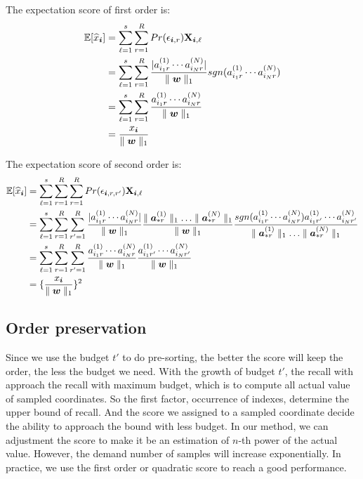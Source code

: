 \documentclass{article}
\newcommand{\Sca}[3]{{#1}^{(#2)}_{i_#2#3}}%
\newcommand{\V}[1]{{\bm{{\MakeLowercase{#1}}}}}%
\newcommand{\Vacol}[1]{\V{a}^{(#1)}_{*r}}
\newcommand{\M}[1]{{\bm{\mathbf{\MakeUppercase{#1}}}}}%
\newcommand{\norm}[2]{\parallel#1\parallel_{#2}}
\begin{document}
The expectation score of first order is:
\begin{align*}
\mathbb{E}[\widehat{x}_{\V{i}}]& =\sum_{\ell=1}^{s}\sum_{r=1}^{R} Pr(\epsilon_{\V{i},r})\M{X}_{\V{i},\ell}\\
& = \sum_{\ell=1}^{s}\sum_{r=1}^{R} \frac{|\Sca{a}{1}{r}\cdots\Sca{a}{N}{r}|}{\norm{\V{W}}{1}}sgn(\Sca{a}{1}{r}\cdots\Sca{a}{N}{r})\\
& = \sum_{\ell=1}^{s}\sum_{r=1}^{R} \frac{\Sca{a}{1}{r}\cdots\Sca{a}{N}{r}}{\norm{\V{W}}{1}}\\
& = \frac{x_{\V{i}}}{\norm{\V{w}}{1}}
\end{align*}

The expectation score of second order is:
\begin{align*}
\mathbb{E}[\widehat{x}_{\V{i}}]& =\sum_{\ell=1}^{s}\sum_{r=1}^{R}\sum_{r=1}^{R} Pr(\epsilon_{\V{i},r,r'})\M{X}_{\V{i},\ell}\\
& = \sum_{\ell=1}^{s}\sum_{r=1}^{R}\sum_{r'=1}^{R} \frac{|\Sca{a}{1}{r}\cdots\Sca{a}{N}{r}|}{\norm{\V{W}}{1}}
\frac{\norm{\Vacol{1}}{1}\ldots\norm{\Vacol{N}}{1}}{\norm{\V{W}}{1}}
\frac{sgn(\Sca{a}{1}{r}\cdots\Sca{a}{N}{r})\Sca{a}{1}{r'}\cdots\Sca{a}{N}{r'}}{ \norm{\Vacol{1}}{1}\ldots\norm{\Vacol{N}}{1}}\\
& = \sum_{\ell=1}^{s}\sum_{r=1}^{R}\sum_{r'=1}^{R} \frac{\Sca{a}{1}{r}\cdots\Sca{a}{N}{r}}{\norm{\V{W}}{1}}\frac{\Sca{a}{1}{r'}\cdots\Sca{a}{N}{r'}}{\norm{\V{W}}{1}}\\
& = \{\frac{x_{\V{i}}}{\norm{\V{w}}{1}}\}^2
\end{align*}


\subsection{Order preservation}

Since we use the budget $t'$ to do pre-sorting, the better the score will keep the order, the less the budget we need. With the growth of budget $t'$, the recall with approach the recall with maximum budget, which is to compute all actual value of sampled coordinates. So the first factor, occurrence of indexes, determine the upper bound of recall. And the score we assigned to a sampled coordinate decide the ability to approach the bound with less budget. In our method, we can adjustment the score to make it be an estimation of $n$-th power of the actual value. However, the demand number of samples will increase exponentially. In practice, we use the first order or quadratic score to reach a good performance.
\end{document}
